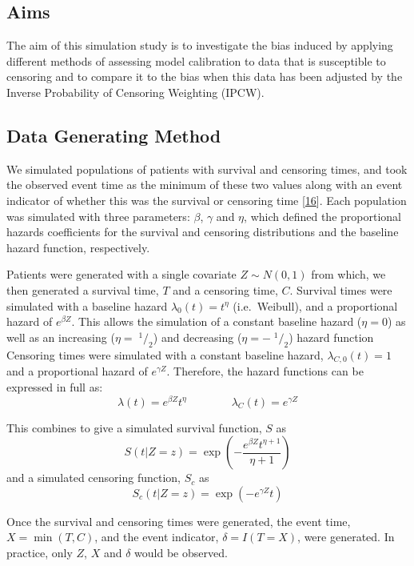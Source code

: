 \documentclass[
]{article}
\newcommand{\sfrac}[2]{\;^{#1}/_{#2}}
\begin{document}
\hypertarget{aims}{%
\subsection{Aims}\label{aims}}

The aim of this simulation study is to investigate the bias induced by applying different methods of assessing model calibration to data that is susceptible to censoring and to compare it to the bias when this data has been adjusted by the Inverse Probability of Censoring Weighting (IPCW).

\hypertarget{data-generating-method}{%
\subsection{Data Generating Method}\label{data-generating-method}}

We simulated populations of patients with survival and censoring times, and took the observed event time as the minimum of these two values along with an event indicator of whether this was the survival or censoring time {[}\protect\hyperlink{ref-burton_design_2006}{16}{]}. Each population was simulated with three parameters: \(\beta\), \(\gamma\) and \(\eta\), which defined the proportional hazards coefficients for the survival and censoring distributions and the baseline hazard function, respectively.

Patients were generated with a single covariate \(Z \sim N(0,1)\) from which, we then generated a survival time, \(T\) and a censoring time, \(C\). Survival times were simulated with a baseline hazard \(\lambda_0(t) = t^{\eta}\) (i.e.~Weibull), and a proportional hazard of \(e^{\beta Z}\). This allows the simulation of a constant baseline hazard (\(\eta = 0\)) as well as an increasing (\(\eta = \sfrac{1}{2}\)) and decreasing (\(\eta = -\sfrac{1}{2}\)) hazard function Censoring times were simulated with a constant baseline hazard, \(\lambda_{C,0}(t) = 1\) and a proportional hazard of \(e^{\gamma Z}\). Therefore, the hazard functions can be expressed in full as:
\[
\lambda(t) = e^{\beta Z}t^{\eta}\qquad\qquad\lambda_C(t)=e^{\gamma Z}
\]

This combines to give a simulated survival function, \(S\) as
\[
S(t|Z=z) = \exp\left(-\frac{e^{\beta Z}t^{\eta+1}}{\eta+1}\right)
\]
and a simulated censoring function, \(S_c\) as
\[
S_c(t|Z=z) = \exp\left(-e^{\gamma Z}t\right)
\]

Once the survival and censoring times were generated, the event time, \(X = \min(T,C)\), and the event indicator, \(\delta = I(T=X)\), were generated. In practice, only \(Z\), \(X\) and \(\delta\) would be observed.
\end{document}
